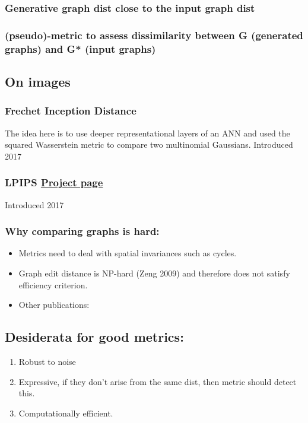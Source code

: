 \documentclass[12pt]{article}
\begin{document}
\subsubsection{Generative graph dist close to the input graph dist}
\label{sec:org5ee9482}
\subsubsection{(pseudo)-metric to assess dissimilarity between G (generated graphs) and G* (input graphs)}
\label{sec:org8d51c09}
\subsection{On images}
\label{sec:org03f83c9}
\subsubsection{Frechet Inception Distance}
\label{sec:org747ed08}
The idea here is to use deeper representational layers of an ANN and used the squared Wasserstein metric to compare two multinomial Gaussians.
Introduced 2017
\subsubsection{LPIPS \href{https://richzhang.github.io/PerceptualSimilarity/}{Project page}}
\label{sec:org5c91634}
Introduced 2017
\subsubsection{Why comparing graphs is hard:}
\label{sec:org3ede22e}
\begin{itemize}
\item Metrics need to deal with spatial invariances such as cycles.
\item Graph edit distance is NP-hard (Zeng 2009) and therefore does not satisfy efficiency criterion.
\item Other publications:
\end{itemize}
\subsection{Desiderata for good metrics:}
\label{sec:orgbb828c4}
\begin{enumerate}
\item Robust to noise
\item Expressive, if they don't arise from the same dist, then metric should detect this.
\item Computationally efficient.
\end{enumerate}
\end{document}
